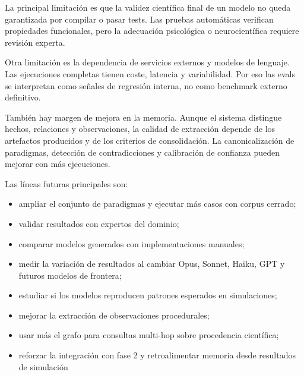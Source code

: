 La principal limitación es que la validez científica final de un modelo no
queda garantizada por compilar o pasar tests. Las pruebas automáticas verifican
propiedades funcionales, pero la adecuación psicológica o neurocientífica
requiere revisión experta.

Otra limitación es la dependencia de servicios externos y modelos de lenguaje.
Las ejecuciones completas tienen coste, latencia y variabilidad. Por eso las
evals se interpretan como señales de regresión interna, no como benchmark
externo definitivo.

También hay margen de mejora en la memoria. Aunque el sistema distingue hechos,
relaciones y observaciones, la calidad de extracción depende de los artefactos
producidos y de los criterios de consolidación. La canonicalización de
paradigmas, detección de contradicciones y calibración de confianza pueden
mejorar con más ejecuciones.

Las líneas futuras principales son:

\begin{itemize}
\item ampliar el conjunto de paradigmas y ejecutar más casos con corpus cerrado;
\item validar resultados con expertos del dominio;
\item comparar modelos generados con implementaciones manuales;
\item medir la variación de resultados al cambiar Opus, Sonnet, Haiku, GPT y
      futuros modelos de frontera;
\item estudiar si los modelos reproducen patrones esperados en simulaciones;
\item mejorar la extracción de observaciones procedurales;
\item usar más el grafo para consultas multi-hop sobre procedencia científica;
\item reforzar la integración con fase 2 y retroalimentar memoria desde resultados de simulación
\end{itemize}
